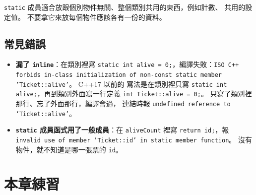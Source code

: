 \texttt{static} 成員適合放跟個別物件無關、整個類別共用的東西，例如計數、
共用的設定值。 不要拿它來放每個物件應該各有一份的資料。

\subsection{常見錯誤}

\begin{itemize}
\item \textbf{漏了 \texttt{inline}}：在類別裡寫
\texttt{static int alive = 0;}，編譯失敗：\texttt{ISO C++ forbids in-class
initialization of non-const static member 'Ticket::alive'}。 C++17 以前的
寫法是在類別裡只寫 \texttt{static int alive;}，再到類別外面寫一行定義
\texttt{int Ticket::alive = 0;}。 只寫了類別裡那行、忘了外面那行，編譯會過，
連結時報 \texttt{undefined reference to `Ticket::alive'}。
\item \textbf{\texttt{static} 成員函式用了一般成員}：在 \texttt{aliveCount}
裡寫 \texttt{return id;}，報 \texttt{invalid use of member 'Ticket::id' in
static member function}。 沒有物件，就不知道是哪一張票的 \texttt{id}。
\end{itemize}

\section{本章練習}
\label{sec:ch5-exercises}

